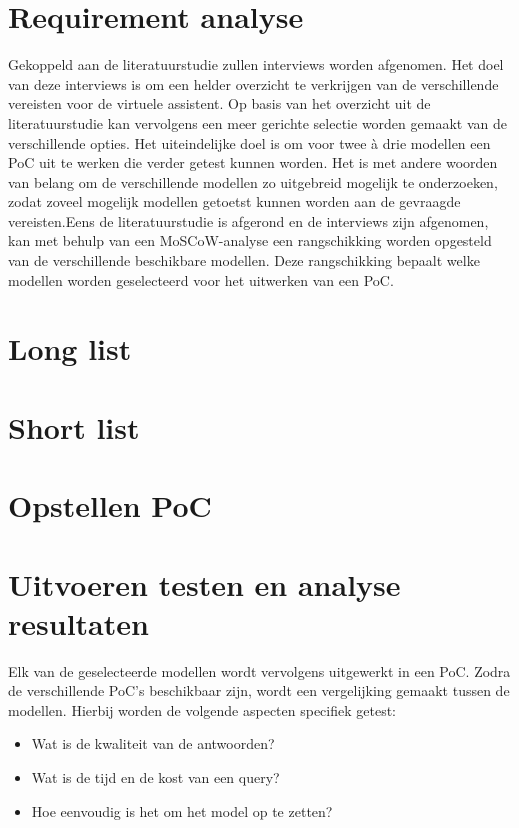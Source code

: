 \section{Requirement analyse}


Gekoppeld aan de literatuurstudie zullen interviews worden afgenomen. Het doel van deze interviews is om een helder overzicht te verkrijgen van de verschillende vereisten voor de virtuele assistent. Op basis van het overzicht uit de literatuurstudie kan vervolgens een meer gerichte selectie worden gemaakt van de verschillende opties. Het uiteindelijke doel is om voor twee à drie modellen een PoC uit te werken die verder getest kunnen worden. Het is met andere woorden van belang om de verschillende modellen zo uitgebreid mogelijk te onderzoeken, zodat zoveel mogelijk modellen getoetst kunnen worden aan de gevraagde vereisten.Eens de literatuurstudie is afgerond en de interviews zijn afgenomen, kan met behulp van een MoSCoW-analyse een rangschikking worden opgesteld van de verschillende beschikbare modellen. Deze rangschikking bepaalt welke modellen worden geselecteerd voor het uitwerken van een PoC.

\section{Long list}

\section{Short list}

\section{Opstellen PoC}

\section{Uitvoeren testen en analyse resultaten}

Elk van de geselecteerde modellen wordt vervolgens uitgewerkt in een PoC. Zodra de verschillende PoC’s beschikbaar zijn, wordt een vergelijking gemaakt tussen de modellen. Hierbij worden de volgende aspecten specifiek getest:

\begin{itemize} 
    \item Wat is de kwaliteit van de antwoorden? 
    \item Wat is de tijd en de kost van een query?
    \item Hoe eenvoudig is het om het model op te zetten? 
\end{itemize}

